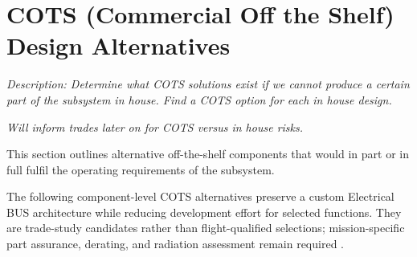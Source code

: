 \documentclass[10pt]{../datasheet}
\let\cite\citep
\begin{document}
\section{COTS (Commercial Off the Shelf) Design Alternatives}

\textit{Description: Determine what COTS solutions exist if we cannot produce a certain part of the subsystem in house. Find a COTS option for each in house design.}

\textit{Will inform trades later on for COTS versus in house risks.}

This section outlines alternative off-the-shelf components that would in part or
in full fulfil the operating requirements of the subsystem.

The following component-level COTS alternatives preserve a custom Electrical
BUS architecture while reducing development effort for selected functions.
They are trade-study candidates rather than flight-qualified selections;
mission-specific part assurance, derating, and radiation assessment remain
required \cite{ecss_cots_2025}.
\end{document}

